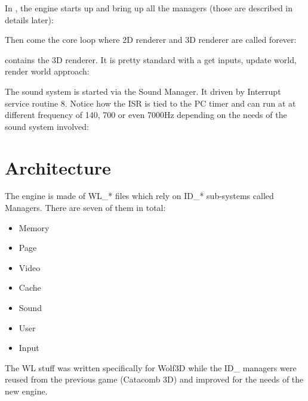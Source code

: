 \documentclass[book.tex]{subfiles}
\begin{document}
\par
In , the engine starts up and bring up all the managers (those are described in details later):\\
\par
\begin{minipage}{\textwidth}

\end{minipage}
\par
Then come the core loop where 2D renderer and 3D renderer are called forever:\\
\par
\begin{minipage}{\textwidth}

\end{minipage}
\par
{} contains the 3D renderer. It is pretty standard with a get inputs, update world, render world approach:\\
\par
\begin{minipage}{\textwidth}

\end{minipage}
\par
The sound system is started via the Sound Manager. It driven by Interrupt service routine 8. Notice how the ISR is tied to the PC timer and can run at at different frequency of 140, 700 or even 7000Hz depending on the needs of the sound system involved:\\
\par
\begin{minipage}{\textwidth}

\end{minipage}
\par

















\section{Architecture}

The engine is made of WL\_* files which rely on ID\_* sub-systems called Managers. There are seven of them in total:\\
\begin{itemize}
	\item Memory
	\item Page
	\item Video
	\item Cache
	\item Sound
	\item User
	\item Input
\end{itemize}
The WL stuff was written specifically for Wolf3D while the ID\_ managers were reused from the previous game (Catacomb 3D) and improved for the needs of the new engine.
\end{document}

